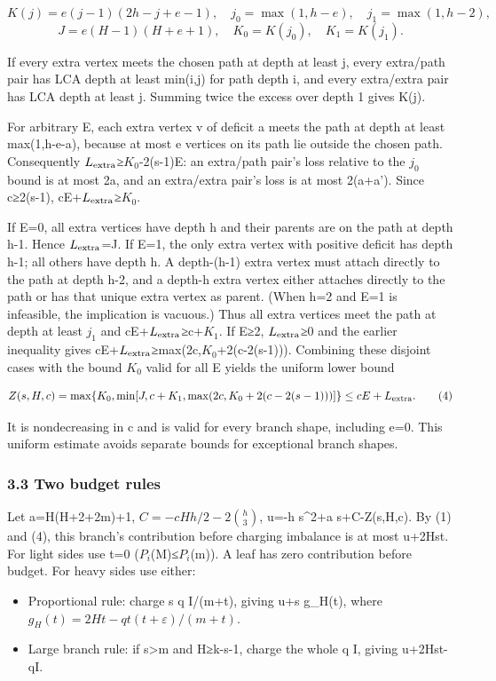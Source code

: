 \documentclass[
  10pt,
  a4paper,
]{article}
\providecommand{\tightlist}{%
  \setlength{\itemsep}{0pt}\setlength{\parskip}{0pt}}
\begin{document}
\[K(j)=e(j-1)(2h-j+e-1),\quad j_0=\max(1,h-e),\quad j_1=\max(1,h-2),\]
\[J=e(H-1)(H+e+1),\quad K_0=K(j_0),\quad K_1=K(j_1).\]

If every extra vertex meets the chosen path at depth at least j, every
extra/path pair has LCA depth at least min(i,j) for path depth i, and
every extra/extra pair has LCA depth at least j. Summing twice the
excess over depth 1 gives K(j).

For arbitrary E, each extra vertex v of deficit a meets the path at
depth at least max(1,h-e-a), because at most e vertices on its path lie
outside the chosen path. Consequently \(L_{\rm extra}\)≥\(K_0\)-2(s-1)E:
an extra/path pair's loss relative to the \(j_0\) bound is at most 2a,
and an extra/extra pair's loss is at most 2(a+a'). Since c≥2(s-1),
cE+\(L_{\rm extra}\)≥\(K_0\).

If E=0, all extra vertices have depth h and their parents are on the
path at depth h-1. Hence \(L_{\rm extra}\)=J. If E=1, the only extra
vertex with positive deficit has depth h-1; all others have depth h. A
depth-(h-1) extra vertex must attach directly to the path at depth h-2,
and a depth-h extra vertex either attaches directly to the path or has
that unique extra vertex as parent. (When h=2 and E=1 is infeasible, the
implication is vacuous.) Thus all extra vertices meet the path at depth
at least \(j_1\) and cE+\(L_{\rm extra}\)≥c+\(K_1\). If E≥2,
\(L_{\rm extra}\)≥0 and the earlier inequality gives
cE+\(L_{\rm extra}\)≥max(2c,\(K_0\)+2(c-2(s-1))). Combining these
disjoint cases with the bound \(K_0\) valid for all E yields the uniform
lower bound

\[Z(s,H,c)=\max\{K_0,\min[J,c+K_1,\max(2c,K_0+2(c-2(s-1)))]\}\le cE+L_{\rm extra}.\tag{4}\]

It is nondecreasing in c and is valid for every branch shape, including
e=0. This uniform estimate avoids separate bounds for exceptional branch
shapes.

\subsubsection{3.3 Two budget rules}\label{two-budget-rules}

Let a=H(H+2+2m)+1, \(C=-cHh/2-2\binom h3\), u=-h s\^{}2+a s+C-Z(s,H,c).
By (1) and (4), this branch's contribution before charging imbalance is
at most u+2Hst. For light sides use t=0 (\(P_i\)(M)≤\(P_i\)(m)). A leaf
has zero contribution before budget. For heavy sides use either:

\begin{itemize}
\tightlist
\item
  Proportional rule: charge s q I/(m+t), giving u+s g\_H(t), where
  \(g_H(t)=2Ht-qt(t+\varepsilon)/(m+t)\).
\item
  Large branch rule: if s\textgreater m and H≥k-s-1, charge the whole q
  I, giving u+2Hst-qI.
\end{itemize}
\end{document}
